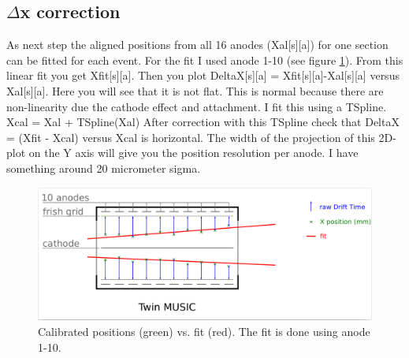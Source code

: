 \documentclass{report}
\begin{document}
\subsection{$\Delta$x correction}
As next step the aligned positions from all 16 anodes (Xal[s][a]) for one section can be fitted for each event. For the fit I used anode 1-10 (see figure \ref{fig:anodes_pos_fit}).\newline 
From this linear fit you get Xfit[s][a].\newline
Then you plot DeltaX[s][a] = Xfit[s][a]-Xal[s][a] versus Xal[s][a].\newline
Here you will see that it is not flat. This is normal because there are non-linearity due the cathode effect and attachment. I fit this using a TSpline.\newline
Xcal = Xal + TSpline(Xal)\newline
After correction with this TSpline check that DeltaX = (Xfit - Xcal) versus Xcal is horizontal. The width of the projection of this 2D-plot on the Y axis will give you the position resolution per anode.
I have something around 20 micrometer sigma.
\begin{figure}[!htb]
  \includegraphics[width=\linewidth]{twim_fit_anodes.png}
	\caption{Calibrated positions (green) vs. fit (red). The fit is done using anode 1-10.}
  \label{fig:anodes_pos_fit}
\end{figure}
\end{document}
